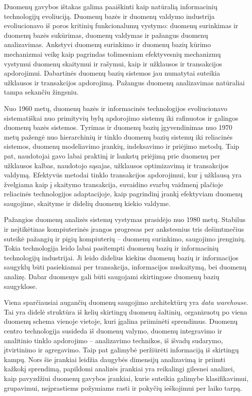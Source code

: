 Duomenų gavybos ištakas galima paaiškinti kaip natūralią informacinių technologijų evoliuciją. 
Duomenų bazės ir duomenų valdymo industrija evoliucionavo iš poros kritinių funkcionalumų vystymo: duomenų surinkimas ir duomenų bazės sukūrimas, duomenų valdymas ir pažangus duomenų analizavimas. 
Ankstyvi duomenų surinkimo ir duomenų bazių kūrimo mechanizmai veikę kaip pagrindas tolimesniam efektyvesnių mechanizmų vystymui duomenų skaitymui ir rašymui, kaip ir užklausos ir transakcijos apdorojimui.
Dabartinės duomenų bazių sistemos jau numatytai suteikia užklausos ir transakcijos apdorojimą.
Pažangus duomenų analizavimas natūraliai tampa sekančiu žingsniu. 

Nuo 1960 metų, duomenų bazės ir informacinės technologijos evoliucionavo sistematiškai nuo primityvių bylų apdorojimo sistemų iki rafinuotos ir galingos duomenų bazės sistemos.
Tyrimas ir duomenų bazių įgyvendinimas nuo 1970 metų pažengė nuo hierarchinių ir tinklo duomenų bazių sistemų iki reliacinės sistemos, duomenų modeliavimo įrankių, indeksavimo ir priėjimo metodų.
Taip pat, naudotojai gavo labai praktinį ir lankstų priėjimą prie duomenų per užklausos kalbas, naudotojo sąsajas, užklausos optimizavimą ir transakcijos valdymą.
Efektyvūs metodai tinklo transakcijos apdorojimui, kur į užklausą yra žvelgiama kaip į skaitymo transakcija, suvaidino svarbų vaidmenį plačioje reliacinės technologijos adaptacijoje, kaip pagrindinį įrankį efektyviam duomenų saugojime, skaityme ir didelių duomenų kiekio valdyme.

Pažangios duomenų analizės sistemų vystymas prasidėjo nuo  1980 metų.
Stabilus ir neįtikėtinas kompiuterinės įrangos progresas per ankstesnius tris dešimtmečius suteikė pažangių ir pigių kompiuterių -- duomenų surinkimo, saugojimo įrenginių.
Tokia technologija leido labai pasitempti duomenų bazių ir informacinių technologijų industrijai. Ji leido didelius kiekius duomenų bazių ir informacijos saugyklų būti pasiekiamai per transakcija, informacijos nuskaitymą, bei duomenų analizę.
Dabar duomenys gali būti saugojami skirtingose duomenų bazių saugyklose.

Viena sparčiausiai augančių duomenų saugojimo architektūrų yra \textit{data warehouse}.
Tai yra didelė struktūra iš kelių skirtingų duomenų šaltinių, organizuotų po viena duomenų schema vienoje vietoje, kuri įgalina priiminėti sprendimus.
Duomenų centro technologija susideda iš duomenų valymo, duomenų integravimo ir analitinio tinklo apdorojimo -- analizavimo technikos, iš išvadų sudarymo, įtvirtinimo ir agregavimo. Taip pat galimybė peržiūrėti informaciją iš skirtingų kampų.
Nors šie įrankiai leidžia daugybės dimensijų analizavimą ir priimti kažkokį sprendimą, papildomi analizės įrankiai yra reikalingi gilesnei analizei, kaip pavyzdžiui duomenų gavybos įrankiai, kurie suteikia galimybe klasifikavimui, grupavimui, neįprastiems požymiams rasti ir pokyčių ieškojimui per laiko tarpą.

